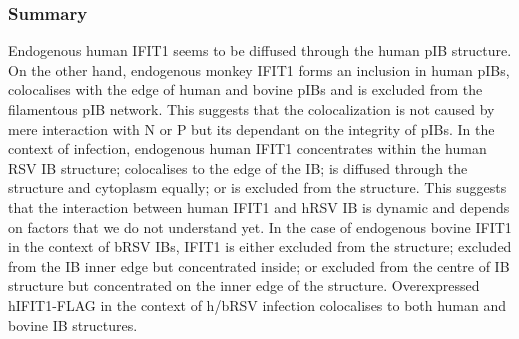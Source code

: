 \subsubsection{Summary} \label{Summary-i1}
Endogenous human IFIT1 seems to be diffused through the human pIB structure. On the other hand, endogenous monkey IFIT1 forms an inclusion in human pIBs, colocalises with the edge of human and bovine pIBs and is excluded from the filamentous pIB network. This suggests that the colocalization is not caused by mere interaction with N or P but its dependant on the integrity of pIBs. In the context of infection, endogenous human IFIT1 concentrates within the human RSV IB structure; colocalises to the edge of the IB; is diffused through the structure and cytoplasm equally; or is excluded from the structure. This suggests that the interaction between human IFIT1 and hRSV IB is dynamic and depends on factors that we do not understand yet. In the case of endogenous bovine IFIT1 in the context of bRSV IBs, IFIT1 is either excluded from the structure; excluded from the IB inner edge but concentrated inside; or excluded from the centre of IB structure but concentrated on the inner edge of the structure. Overexpressed hIFIT1-FLAG in the context of h/bRSV infection colocalises to both human and bovine IB structures.